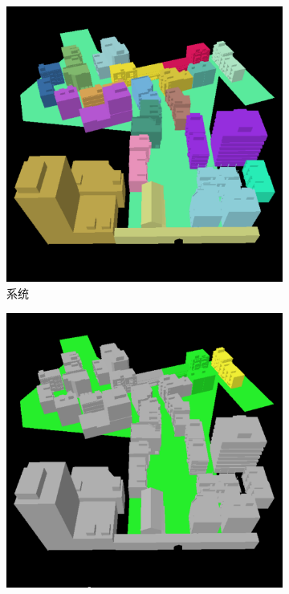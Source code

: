 \begin{figure}
	\begin{subfigure}[b]{0.285\textwidth}
		\includegraphics[width=1.\textwidth]{figures/r/path-30-1}
		\caption{系统}
	\end{subfigure}
	\begin{subfigure}[b]{0.285\textwidth}
		\includegraphics[width=1.\textwidth]{figures/r/path-30-2}

\end{subfigure}
\end{figure}
